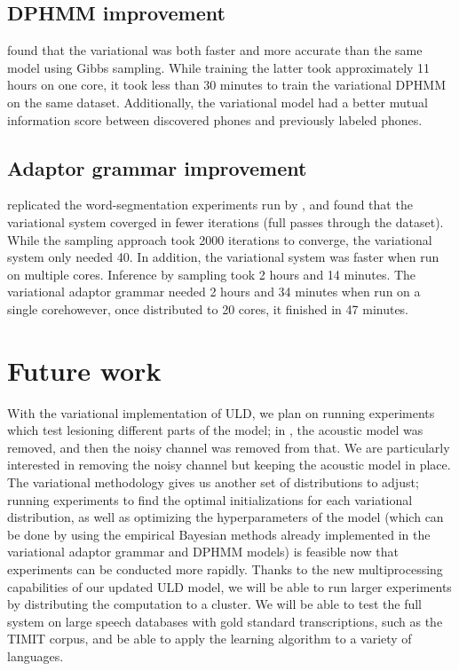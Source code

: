 \documentclass[12pt,letterpaper]{article}
\begin{document}
\subsection{DPHMM improvement}
\citet{ondel:2016} found that the variational was both faster and more accurate than the same model using Gibbs sampling. While training the latter took approximately 11 hours on one core, it took less than 30 minutes to train the variational DPHMM on the same dataset. Additionally, the variational model had a better mutual information score between discovered phones and previously labeled phones. 

\subsection{Adaptor grammar improvement}
\citet{cohen:dissertation} replicated the word-segmentation experiments run by \citet{johnson:2009}, and found that the variational system coverged in fewer iterations (full passes through the dataset). While the sampling approach took 2000 iterations to converge, the variational system only needed 40. In addition, the variational system was faster when run on multiple cores. Inference by sampling took 2 hours and 14 minutes. The variational adaptor grammar needed 2 hours and 34 minutes when run on a single core\textemdash however, once distributed to 20 cores, it finished in 47 minutes. 

\section{Future work}
With the variational implementation of ULD, we plan on running experiments which test lesioning different parts of the model; in \citet{lee:2015}, the acoustic model was removed, and then the noisy channel was removed from that. We are particularly interested in removing the noisy channel but keeping the acoustic model in place. The variational methodology gives us another set of distributions to adjust; running experiments to find the optimal initializations for each variational distribution, as well as optimizing the hyperparameters of the model (which can be done by using the empirical Bayesian methods already implemented in the variational adaptor grammar and DPHMM models) is feasible now that experiments can be conducted more rapidly. Thanks to the new multiprocessing capabilities of our updated ULD model, we will be able to run larger experiments by distributing the computation to a cluster. We will be able to test the full system on large speech databases with gold standard transcriptions, such as the TIMIT corpus, and be able to apply the learning algorithm to a variety of languages. 
\end{document}
